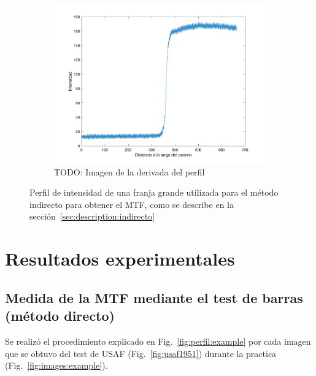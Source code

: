 \documentclass{./packages/optica-article}
\begin{document}
\begin{figure}[hptb]
\begin{subfigure}[t]{0.31\textwidth}
		\includegraphics[width=\textwidth]{edge_perfil}
		\caption{TODO: Imagen de la derivada del perfil}\label{fig:perfil:lsf}
	\end{subfigure}

	\caption{Perfil de intensidad de una franja grande utilizada para el método indirecto para obtener el MTF, como se describe en la sección~\ref{sec:description:indirecto}}\label{fig:perfil}
\end{figure}

\section{Resultados experimentales}\label{sec:resultados}

\subsection{Medida de la MTF mediante el test de barras (método directo)}\label{sec:resultados:directo}
Se realizó el procedimiento explicado en Fig.~\ref{fig:perfil:example} por cada imagen que se obtuvo del test de USAF (Fig.~\ref{fig:usaf1951}) durante la practica (Fig.~\ref{fig:images:example}).
\end{document}
